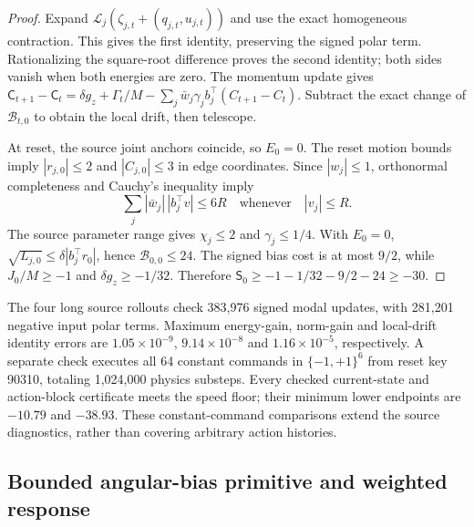 \begin{proof}
Expand $\mathcal L_j(\zeta_{j,t}+(q_{j,t},u_{j,t}))$ and use the exact homogeneous contraction.
This gives the first identity, preserving the signed polar term.
Rationalizing the square-root difference proves the second identity; both sides vanish when both energies are zero.
The momentum update gives
$\mathsf C_{t+1}-\mathsf C_t=\delta g_z+\Gamma_t/M-\sum_j\bar w_j\gamma_jb_j^\top(C_{t+1}-C_t)$.
Subtract the exact change of $\mathcal B_{t,0}$ to obtain the local drift, then telescope.

At reset, the source joint anchors coincide, so $E_0=0$.
The reset motion bounds imply $|r_{j,0}|\le2$ and $|C_{j,0}|\le3$ in edge coordinates.
Since $|w_j|\le1$, orthonormal completeness and Cauchy's inequality imply
\begin{equation}
 \sum_j|\bar w_j|\,|b_j^\top v|\le6R
 \quad\text{whenever}\quad |v_j|\le R.
\end{equation}
The source parameter range gives $\chi_j\le2$ and $\gamma_j\le1/4$.
With $E_0=0$, $\sqrt{L_{j,0}}\le\delta|b_j^\top r_0|$, hence $\mathcal B_{0,0}\le24$.
The signed bias cost is at most $9/2$, while $J_0/M\ge-1$ and $\delta g_z\ge-1/32$.
Therefore $\mathsf S_0\ge-1-1/32-9/2-24\ge-30$.
\end{proof}

The four long source rollouts check 383,976 signed modal updates, with 281,201 negative input polar terms.
Maximum energy-gain, norm-gain and local-drift identity errors are $1.05\times10^{-9}$, $9.14\times10^{-8}$ and $1.16\times10^{-5}$, respectively.
A separate check executes all 64 constant commands in $\{-1,+1\}^6$ from reset key 90310, totaling 1,024,000 physics substeps.
Every checked current-state and action-block certificate meets the speed floor; their minimum lower endpoints are $-10.79$ and $-38.93$.
These constant-command comparisons extend the source diagnostics, rather than covering arbitrary action histories.

\subsection{Bounded angular-bias primitive and weighted response}
\label{app:angular_primitive}

